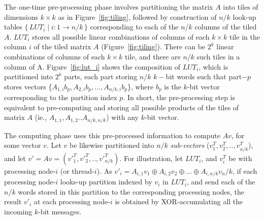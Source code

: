 \documentclass[conference, 9pt]{IEEEtran}
\begin{document}
The one-time pre-processing phase involves partitioning the matrix $A$ into tiles of dimensions $k\times k$ as in Figure~\ref{fig:tiling},
followed by construction of $n/k$ look-up tables $\{\, LUT_i \mid i: 1 \to n/k \,\}$ corresponding to each of the $n/k$ columns of the tiled $A$.
$LUT_i$ stores all possible linear combinations of columns of each $k\times k$ tile in the column $i$ of the tiled matrix $A$ (Figure~\ref{fig:tiling}).
There can be $2^k$ linear combinations of columns of each $k\times k$ tile, and there are $n/k$ such tiles in a column of A. 
Figure~\ref{fig:lut_i} shows the composition of $LUT_i$, which is partitioned into $2^k$ parts, each part storing $n/k$ $k-$bit words such that part$-p$ stores vectors
\{$A_{1,i}b_{p}, A_{2,i}b_{p}, ... , A_{n/k,i}b_{p}$\}, where $b_p$ is the $k$-bit vector corresponding to the partition index $p$. In short, the pre-processing step is equivalent to pre-computing and storing all possible products of
the tiles of matrix $A$ (ie., $A_{1,1}, A_{1,2} .. A_{n/k,n/k}$) with any $k$-bit vector.
 
The computing phase uses this pre-processed information to compute $Av$, for some vector $v$. Let $v$ be likewise partitioned into $n/k$ \emph{sub-vectors} ($v^T_1, v^T_2, .. , v^T_{n/k}$), and 
let $v' = Av = (v'^T_1, v'^T_2, .. , v'^T_{n/k})$. For illustration, let $LUT_i$, and $v^T_i$ be with processing node-$i$ (or thread-$i$). 
As $v'_i = A_{i,1}v_1\oplus A_{i,2}v_2 \oplus \ldots \oplus A_{i,n/k}v_n/k$, if each processing node-$i$ looks-up partition indexed by $v_i$ in $LUT_i$, and send each of the $n/k$ words stored
in this partition to the corresponding processing nodes, the result $v'_i$ at each processing node-$i$ is obtained by XOR-accumulating all the incoming $k$-bit messages.
\end{document}
